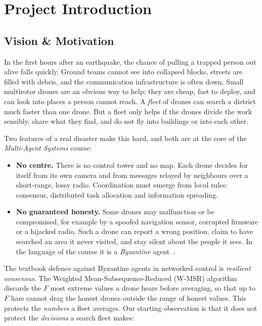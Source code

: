 \chapter[Introduction]{Project Introduction}
\label{cp:introduction}

\parindent0pt

\section{Vision \& Motivation}
\label{sec:vision}

In the first hours after an earthquake, the chance of pulling a trapped person out alive falls quickly. Ground teams
cannot see into collapsed blocks, streets are filled with debris, and the communication infrastructure is often down.
Small multirotor drones are an obvious way to help: they are cheap, fast to deploy, and can look into places a person
cannot reach. A \emph{fleet} of drones can search a district much faster than one drone. But a fleet only helps if the
drones divide the work sensibly, share what they find, and do not fly into buildings or into each other.

Two features of a real disaster make this hard, and both are at the core of the \emph{Multi-Agent Systems} course:

\begin{itemize}
  \item \textbf{No centre.} There is no control tower and no map. Each drone decides for itself from its own camera
        and from messages relayed by neighbours over a short-range, lossy radio. Coordination must emerge from local
        rules: consensus, distributed task allocation and information spreading.
  \item \textbf{No guaranteed honesty.} Some drones may malfunction or be compromised, for example by a spoofed
        navigation sensor, corrupted firmware or a hijacked radio. Such a drone can report a wrong position, claim to
        have searched an area it never visited, and stay silent about the people it sees. In the language of the
        course it is a \emph{Byzantine} agent~\citep{Lamport1982}.
\end{itemize}

The textbook defence against Byzantine agents in networked control is \emph{resilient consensus}. The Weighted
Mean-Subsequence-Reduced (W-MSR) algorithm~\citep{LeBlanc2013} discards the $F$ most extreme values a drone hears
before averaging, so that up to $F$ liars cannot drag the honest drones outside the range of honest values. This
protects the \emph{numbers} a fleet averages. Our starting observation is that it does not protect the
\emph{decisions} a search fleet makes:

